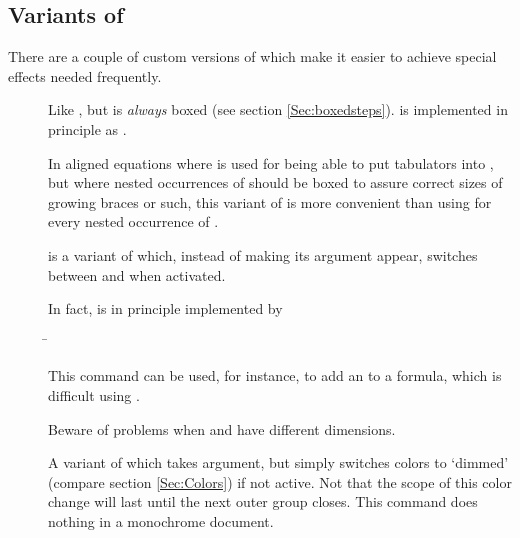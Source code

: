 \documentclass[12pt]{scrartcl}
\let\newslide=\relax
\begin{document}
  \subsection{Variants of }
  There are a couple of custom versions of  which make it easier to achieve special effects needed
  frequently.
  \begin{description}
  \item[]
    Like , but is \emph{always} boxed (see section
    \ref{Sec:boxedsteps}).  is
    implemented in principle as
    .

    In aligned equations where  is used for being able to put tabulators into ,
    but where nested occurrences of  should be boxed to assure correct sizes of growing braces or such,
    this variant of  is more convenient than using  for every nested occurrence
    of .

  \item[]
     is a variant of  which,
    instead of making its argument appear, switches between 
    and  when activated.

    In fact,  is in principle implemented by
    \begin{tabbing}
      \=\\
      \>
    \end{tabbing}

    This command can be used, for instance, to add an  to a formula, which is difficult using
    .

    Beware of problems when  and  have different dimensions.

    \newslide

  \item[]
    A variant of  which takes  argument, but simply
    switches colors to `dimmed' (compare section \ref{Sec:Colors}) if not
    active. Not that the scope of this color change will
    last until the next outer group closes. This command does nothing in a monochrome document.


\end{description}
\end{document}
